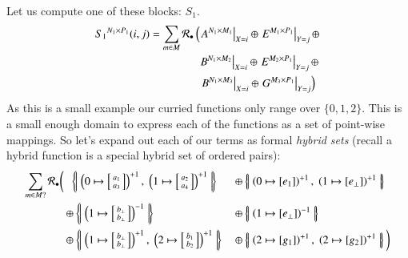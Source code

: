 Let us compute one of these blocks: $S_1$.
\begin{align*}
	{S_1}^{N_1 \times P_1}(i,j) = \sum_{m \in M} \R[\smallmult]  &\left( 
			\left. A^{N_1 \times M_1}\right|_{X=i} \oplus
			\left. E^{M_1 \times P_1}\right|_{Y=j} \oplus \right.\\
			&\;\left. B^{N_1 \times M_2}\right|_{X=i} \oplus
			\left. E^{M_2 \times P_1}\right|_{Y=j} \oplus\\ 
			&\;\left. \left. B^{N_1 \times M_3}\right|_{X=i} \oplus
			\left. G^{M_3 \times P_1}\right|_{Y=j}
	\right)
\end{align*}
As this is a small example our curried functions only range over $\{ 0, 1, 2 \}$.
This is a small enough domain to express each of the functions as a set of point-wise mappings.
So let's expand out each of our terms as formal \emph{hybrid sets} 
(recall a hybrid function is a special hybrid set of ordered pairs):
\begin{align*}
	\sum_{m \in M ?} \R[\smallmult] \bigg( 
		&\;\;\hset{
			\left( 0 \mapsto 
				\left[\begin{smallmatrix}\vphantom{b}a_1 \\ \vphantom{b}a_3 \end{smallmatrix}\right]
			\right)^{+1}, \;
			\left( 1 \mapsto 
				\left[\begin{smallmatrix}\vphantom{b}a_2 \\ \vphantom{b}a_4 \end{smallmatrix}\right]
			\right)^{+1}}  
		&&\oplus \hset{ 
			\left( 0 \mapsto [ e_1 ] \right)^{+1}, \;
			\left( 1 \mapsto [e_\bot] \right)^{+1}} \\ 
		&\oplus \hset{ 
			\left( 1 \mapsto \left[\begin{smallmatrix} b_\bot \\ b_\bot \end{smallmatrix}\right] \right)^{-1} }
		&&\oplus \hset{ 
			\left( 1 \mapsto [ e_\bot ] \right)^{-1} } \\
		&\oplus \hset{
			\left( 1 \mapsto \left[ \begin{smallmatrix} b_\bot \\ b_\bot \end{smallmatrix} \right] \right)^{+1}, \;
			\left( 2 \mapsto \left[ \begin{smallmatrix} b_1 \\ b_2 \end{smallmatrix}\right] \right)^{+1} }
		&&\oplus \hset{
			\left( 2 \mapsto [ g_1 ] \right)^{+1},\; 
			\left( 2 \mapsto [ g_2 ] \right)^{+1}}	\bigg)
\end{align*}


